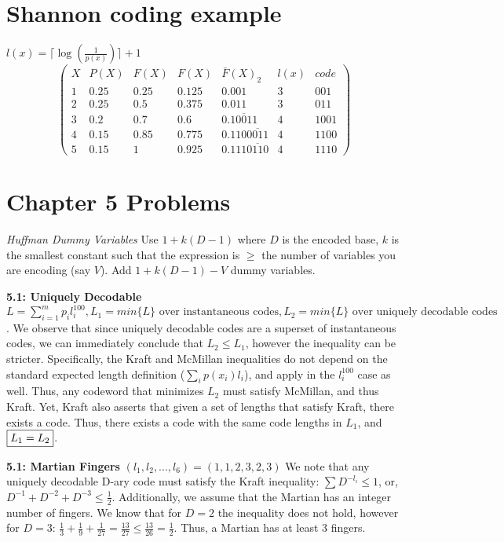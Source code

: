 \documentclass[10pt]{article}
\begin{document}
\begin{tiny}
\begin{multicols}{3}
\section*{Shannon coding example}
$l(x)= \lceil \log(\frac{1}{p(x)}) \rceil + 1$
\[
\begin{pmatrix}
      X & P(X) & F(X)  & F(X) & \bar{F}(X)_{2} & l(x) & code  \\
      1 & 0.25 & 0.25 & 0.125 & 0.001 & 3 & 001\\ 
      2 & 0.25 & 0.5 & 0.375 & 0.011 & 3 & 011\\ 
      3 & 0.2 & 0.7 & 0.6 & 0.\overline{10011} & 4 & 1001\\ 
      4 & 0.15 & 0.85 & 0.775 & 0.110 \overline{0011} & 4 & 1100\\ 
      5 & 0.15 & 1 & 0.925 & 0.111\overline{0110} & 4 & 1110
\end{pmatrix}
\]


\section*{Chapter 5 Problems}
\textit{Huffman Dummy Variables}
Use $1+k(D-1)$ where $D$ is the encoded base, $k$ is the smallest constant such that the expression is $\geq$ the number of variables you are encoding (say $V$). Add $1+k(D-1) - V$ dummy variables.

\textbf{5.1: Uniquely Decodable}
$L = \sum_{i=1}^m p_i l_i^{100}, L_1 = min\{L\} \textrm { over instantaneous codes}, L_2 = min\{L\} \textrm{ over uniquely decodable codes}$. We observe that since uniquely decodable codes are a superset of instantaneous codes, we can immediately conclude that $L_2 \leq L_1$, however the inequality can be stricter. Specifically, the Kraft and McMillan inequalities do not depend on the standard expected length definition ($\sum_i p(x_i)l_i$), and apply in the $l_i^{100}$ case as well. Thus, any codeword that minimizes $L_2$ must satisfy McMillan, and thus Kraft. Yet, Kraft also asserts that given a set of lengths that satisfy Kraft, there exists a code. Thus, there exists a code with the same code lengths in $L_1$, and $\fbox{$L_1 = L_2$}$.

\textbf{5.1: Martian Fingers}
$(l_1,l_2,...,l_6) = (1,1,2,3,2,3)$ We note that any uniquely decodable D-ary code must satisfy the Kraft inequality: $\sum D^{-l_i} \leq 1$, or, $D^{-1} + D^{-2} + D^{-3} \leq \frac{1}{2}$. Additionally, we assume that the Martian has an integer number of fingers. We know that for $D=2$ the inequality does not hold, however for $D=3$: $\frac{1}{3} + \frac{1}{9} + \frac{1}{27} = \frac{13}{27} \leq  \frac{13}{26} = \frac{1}{2}$. Thus, a Martian has at least $3$ fingers.


\end{multicols}
\end{tiny}
\end{document}
